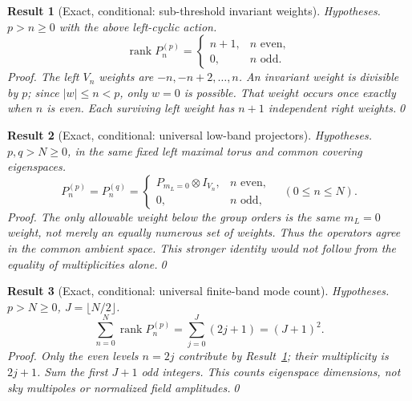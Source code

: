 \documentclass[aps,prd,onecolumn,notitlepage,groupedaddress,11pt]{revtex4-2}
\newtheorem{result}{Result}
\begin{document}
\begin{result}[\textsf{Exact, conditional}: sub-threshold invariant weights]\label{new:97}
\textit{Hypotheses.} $p>n\ge0$ with the above left-cyclic action.
\begin{equation}\label{new:eq97}
\operatorname{rank}P_n^{(p)}=\begin{cases}n+1,&n\text{ even},\\0,&n\text{ odd}.\end{cases}
\end{equation}
\textit{Proof.} The left $V_n$ weights are $-n,-n+2,\ldots,n$. An invariant weight is divisible by $p$; since $|w|\le n<p$, only $w=0$ is possible. That weight occurs once exactly when $n$ is even. Each surviving left weight has $n+1$ independent right weights.\qed
\end{result}

\begin{result}[\textsf{Exact, conditional}: universal low-band projectors]\label{new:98}
\textit{Hypotheses.} $p,q>N\ge0$, in the same fixed left maximal torus and common covering eigenspaces.
\begin{equation}\label{new:eq98}
P_n^{(p)}=P_n^{(q)}=\begin{cases}P_{m_L=0}\otimes I_{V_n},& n\text{ even},\\0,&n\text{ odd},\end{cases}\quad(0\le n\le N).
\end{equation}
\textit{Proof.} The only allowable weight below the group orders is the same $m_L=0$ weight, not merely an equally numerous set of weights. Thus the operators agree in the common ambient space. This stronger identity would not follow from the equality of multiplicities alone.\qed
\end{result}

\begin{result}[\textsf{Exact, conditional}: universal finite-band mode count]\label{new:99}
\textit{Hypotheses.} $p>N\ge0$, $J=\lfloor N/2\rfloor$.
\begin{equation}\label{new:eq99}
\sum_{n=0}^{N}\operatorname{rank}P_n^{(p)}=\sum_{j=0}^{J}(2j+1)=(J+1)^2.
\end{equation}
\textit{Proof.} Only the even levels $n=2j$ contribute by Result~\ref{new:97}; their multiplicity is $2j+1$. Sum the first $J+1$ odd integers. This counts eigenspace dimensions, not sky multipoles or normalized field amplitudes.\qed
\end{result}
\end{document}
